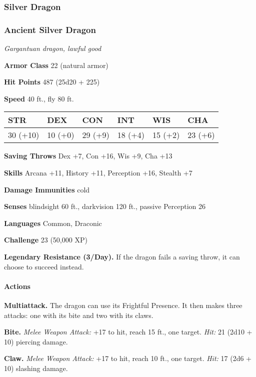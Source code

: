 \documentclass[
]{article}
\begin{document}
\hypertarget{silver-dragon}{%
\subsubsection{Silver Dragon}\label{silver-dragon}}

\hypertarget{ancient-silver-dragon}{%
\subsubsection{Ancient Silver Dragon}\label{ancient-silver-dragon}}

\emph{Gargantuan dragon, lawful good}

\textbf{Armor Class} 22 (natural armor)

\textbf{Hit Points} 487 (25d20 + 225)

\textbf{Speed} 40 ft., fly 80 ft.

\begin{longtable}[]{@{}llllll@{}}
\toprule
STR & DEX & CON & INT & WIS & CHA\tabularnewline
\midrule
\endhead
30 (+10) & 10 (+0) & 29 (+9) & 18 (+4) & 15 (+2) & 23
(+6)\tabularnewline
\bottomrule
\end{longtable}

\textbf{Saving Throws} Dex +7, Con +16, Wis +9, Cha +13

\textbf{Skills} Arcana +11, History +11, Perception +16, Stealth +7

\textbf{Damage Immunities} cold

\textbf{Senses} blindsight 60 ft., darkvision 120 ft., passive
Perception 26

\textbf{Languages} Common, Draconic

\textbf{Challenge} 23 (50,000 XP)

\textbf{Legendary Resistance (3/Day).} If the dragon fails a saving
throw, it can choose to succeed instead.

\hypertarget{actions-59}{%
\paragraph{Actions}\label{actions-59}}

\textbf{Multiattack.} The dragon can use its Frightful Presence. It then
makes three attacks: one with its bite and two with its claws.

\textbf{Bite.} \emph{Melee Weapon Attack:} +17 to hit, reach 15 ft., one
target. \emph{Hit:} 21 (2d10 + 10) piercing damage.

\textbf{Claw.} \emph{Melee Weapon Attack:} +17 to hit, reach 10 ft., one
target. \emph{Hit:} 17 (2d6 + 10) slashing damage.
\end{document}
